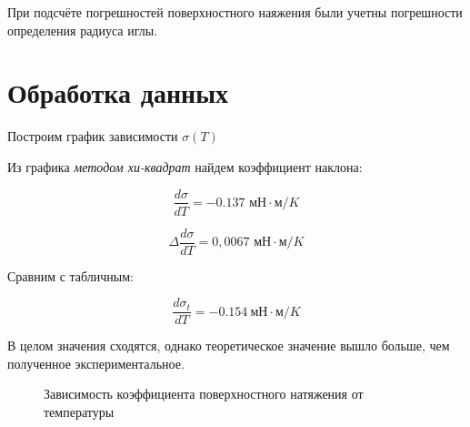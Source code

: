\documentclass[a4paper, 12pt]{article} %
\begin{document}
При подсчёте погрешностей поверхностного наяжения были учетны погрешности определения радиуса иглы.


\bigskip

\section{Обработка данных}

\smallskip

Построим график зависимости $\sigma(T)$

\smallskip

Из графика \textit{методом хи-квадрат} найдем коэффициент наклона:

\smallskip

\begin{equation}
    \frac{d \sigma}{dT} = -0.137 \text{ мН} \cdot \text{м} / K
\end{equation}


\begin{equation}
    \Delta \frac{d \sigma}{dT} = 0,0067 \text{ мН} \cdot \text{м} / K
\end{equation}

Сравним с табличным:

\begin{equation}
    \frac{d\sigma_t}{dT} = -0.154\ \text{мН} \cdot \text{м} / K
\end{equation}

В целом значения сходятся, однако теоретическое значение вышло больше, чем полученное экспериментальное.

\begin{figure}[h]
    \caption{Зависимость коэффициента поверхностного натяжения от температуры}
    \label{gr:1}
\end{figure}
\end{document}
